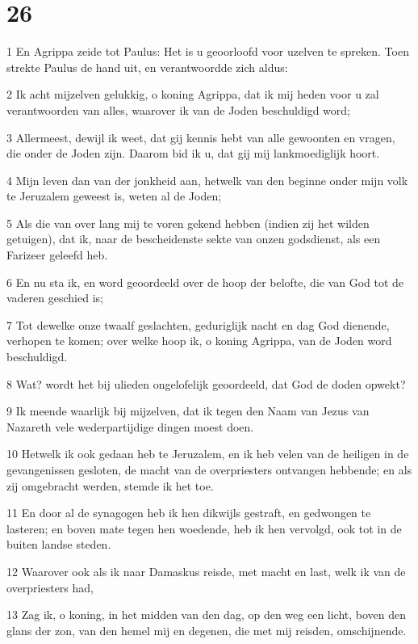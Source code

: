 \chapter{26}

\par 1 En Agrippa zeide tot Paulus: Het is u geoorloofd voor uzelven te spreken. Toen strekte Paulus de hand uit, en verantwoordde zich aldus:
\par 2 Ik acht mijzelven gelukkig, o koning Agrippa, dat ik mij heden voor u zal verantwoorden van alles, waarover ik van de Joden beschuldigd word;
\par 3 Allermeest, dewijl ik weet, dat gij kennis hebt van alle gewoonten en vragen, die onder de Joden zijn. Daarom bid ik u, dat gij mij lankmoediglijk hoort.
\par 4 Mijn leven dan van der jonkheid aan, hetwelk van den beginne onder mijn volk te Jeruzalem geweest is, weten al de Joden;
\par 5 Als die van over lang mij te voren gekend hebben (indien zij het wilden getuigen), dat ik, naar de bescheidenste sekte van onzen godsdienst, als een Farizeer geleefd heb.
\par 6 En nu sta ik, en word geoordeeld over de hoop der belofte, die van God tot de vaderen geschied is;
\par 7 Tot dewelke onze twaalf geslachten, geduriglijk nacht en dag God dienende, verhopen te komen; over welke hoop ik, o koning Agrippa, van de Joden word beschuldigd.
\par 8 Wat? wordt het bij ulieden ongelofelijk geoordeeld, dat God de doden opwekt?
\par 9 Ik meende waarlijk bij mijzelven, dat ik tegen den Naam van Jezus van Nazareth vele wederpartijdige dingen moest doen.
\par 10 Hetwelk ik ook gedaan heb te Jeruzalem, en ik heb velen van de heiligen in de gevangenissen gesloten, de macht van de overpriesters ontvangen hebbende; en als zij omgebracht werden, stemde ik het toe.
\par 11 En door al de synagogen heb ik hen dikwijls gestraft, en gedwongen te lasteren; en boven mate tegen hen woedende, heb ik hen vervolgd, ook tot in de buiten landse steden.
\par 12 Waarover ook als ik naar Damaskus reisde, met macht en last, welk ik van de overpriesters had,
\par 13 Zag ik, o koning, in het midden van den dag, op den weg een licht, boven den glans der zon, van den hemel mij en degenen, die met mij reisden, omschijnende.
